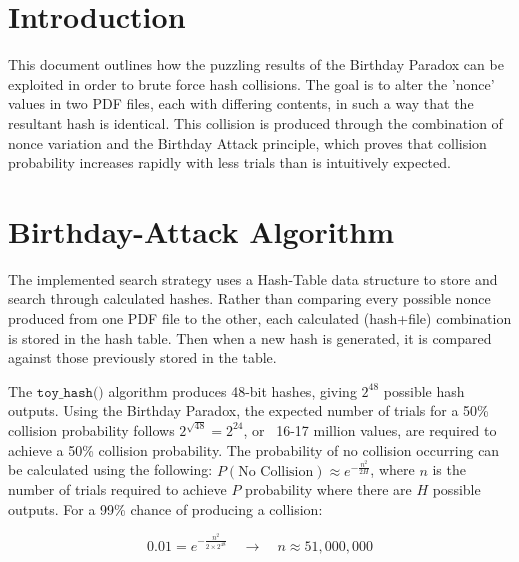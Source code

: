 \documentclass[11pt,a4paper]{article}
\date{Semester 2, 2026}
\author{
  James Oakey \quad (\texttt{22709404})\\
  \and
  Brent Tankink\quad (\texttt{23842541})
}
\begin{document}
\maketitle

\section{Introduction}

This document outlines how the puzzling results of the Birthday Paradox can be
exploited in order to brute force hash collisions. The goal is to alter the 
'nonce' values in two PDF files, each with differing contents, in such a way 
that the resultant hash is identical. This collision is produced through the combination of nonce variation and the 
Birthday Attack principle, which proves that collision probability increases 
rapidly with less trials than is intuitively expected. 

\section{Birthday-Attack Algorithm}
\label{sec:bday}

The implemented search strategy uses a Hash-Table data structure to store and 
search through calculated hashes. Rather than comparing every possible 
nonce produced from one PDF file to the other, each calculated (hash+file) 
combination is stored in the hash table. Then when a new hash is generated, it is
compared against those previously stored in the table. 

The $\texttt{toy\_hash()}$ algorithm produces 48-bit hashes, giving $2^{48}$ 
possible hash outputs. Using the Birthday Paradox, the expected number of trials for 
a 50\% collision probability follows $2^{\sqrt{48}}=2^{24}$, or ~16-17 million values, 
are required to achieve a 50\% collision probability.
The probability of no collision occurring can be calculated using the following: 
$P(\text{No Collision})\approx e^{-\frac{n^2}{2H}}$, where $n$ is the 
number of trials required to achieve $P$ probability where there 
are $H$ possible outputs. For a 99\% chance of producing a collision:

$$0.01=e^{-\frac{n^2}{2\times2^{48}}}\quad\rightarrow\quad n\approx51,000,000$$
\end{document}
